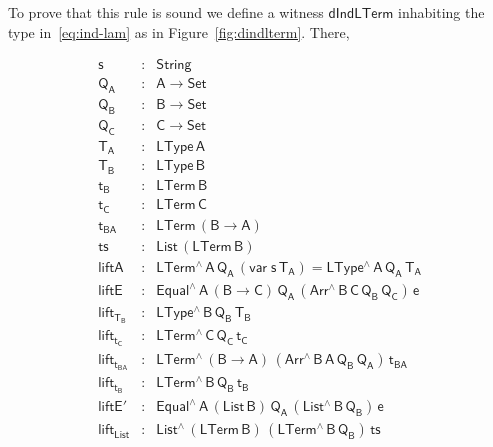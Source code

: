 \documentclass[sigplan,10pt]{acmart}
\begin{document}
To prove that this rule is sound we define a witness
$\mathsf{dIndLTerm}$ inhabiting the type in~\eqref{eq:ind-lam} as in
Figure~\ref{fig:dindlterm}. There,


\[
\begin{array}{lll}
\mathsf{s} & : & \mathsf{String} \\
\mathsf{Q_A} & : & \mathsf{A \to Set} \\
\mathsf{Q_B} & : & \mathsf{B \to Set} \\
\mathsf{Q_C} & : & \mathsf{C \to Set} \\
\mathsf{T_A} & : & \mathsf{LType\, A} \\
\mathsf{T_B} & : & \mathsf{LType\, B} \\
\mathsf{t_B} & : & \mathsf{LTerm \, B} \\
\mathsf{t_C} & : & \mathsf{LTerm \, C} \\
\mathsf{t_{BA}} & : & \mathsf{LTerm \, (B \to A)} \\
\mathsf{ts} & : & \mathsf{List\, (LTerm\, B)}\\
\mathsf{liftA} & : & \mathsf{LTerm^{\wedge}\, A\, Q_A\, (var\;s\,T_A) = LType^{\wedge}\,A\,Q_A\,T_A} \\
\mathsf{liftE} & : & \mathsf{Equal^{\wedge}\, A\, (B \to C)\, Q_A\, (Arr^{\wedge} \, B\, C\, Q_B \, Q_C) \, e} \\
\mathsf{lift_{T_B}} & : & \mathsf{LType^{\wedge} \, B\, Q_B\, T_B} \\
\mathsf{lift_{t_C}} & : & \mathsf{LTerm^{\wedge} \, C\, Q_C\, t_C} \\
\mathsf{lift_{t_{BA}}} & : & \mathsf{LTerm^{\wedge} \, (B \to A)\, (Arr^{\wedge} \, B\, A\, Q_B \, Q_A)\, t_{BA}} \\
\mathsf{lift_{t_B}} & : & \mathsf{LTerm^{\wedge} \, B\, Q_B\, t_B} \\
\mathsf{liftE'} & : & \mathsf{Equal^{\wedge}\, A\, (List\,B)\, Q_A\, (List^{\wedge}\, B\, Q_B)\, e} \\
\mathsf{lift_{List}} & : & \mathsf{List^{\wedge} \, (LTerm\, B) \,
  (LTerm^{\wedge}\, B\, Q_B) \, ts}
\end{array}
\]
\end{document}
